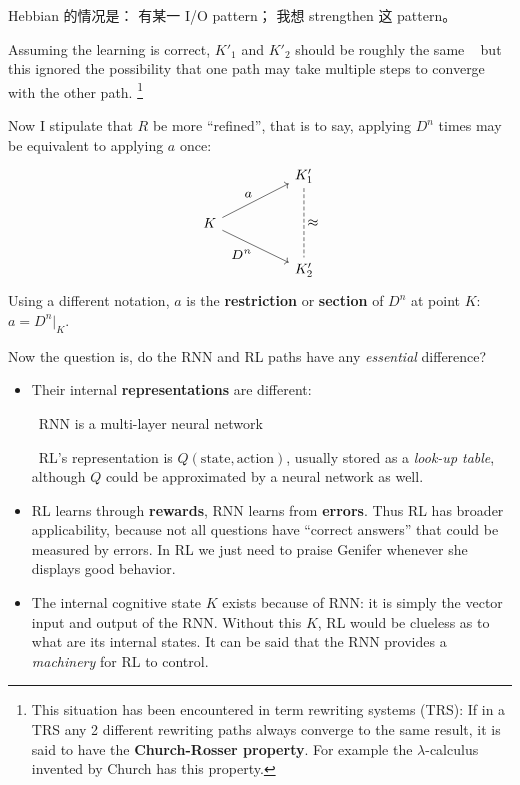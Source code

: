 \documentclass[orivec]{llncs}
\newcommand{\emp}[1]{\textbf{#1}}
\newcommand{\dashh}{\textemdash~}
\begin{document}
Hebbian 的情况是： 有某一 I/O pattern； 我想 strengthen 这 pattern。 

Assuming the learning is correct, $K'_1$ and $K'_2$ should be roughly the same \textemdash~ but this ignored the possibility that one path may take multiple steps to converge with the other path.  \footnote{This situation has been encountered in term rewriting systems (TRS):  If in a TRS any 2 different rewriting paths always converge to the same result, it is said to have the \emp{Church-Rosser property}.  For example the $\lambda$-calculus invented by Church has this property.} 

Now I stipulate that $R$ be more ``refined'', that is to say, applying $D^n$ times may be equivalent to applying $a$ once:
\begin{equation}
\begin{tikzcd}[column sep=huge]
& K'_1 \arrow[dd, dashed, no head, "\scalebox{1.3}{$\approx$}"] \\
K \arrow[ur, "\scalebox{1.3}{$a$}"] \arrow[dr, "{\scalebox{1.3}{$D^n$}}"'] & \\
& K'_2
\end{tikzcd}
\end{equation}
Using a different notation, $a$ is the \emp{restriction} or \emp{section} of $D^n$ at point $K$: $a = D^n|_K$.

Now the question is, do the RNN and RL paths have any \textit{essential} difference?
\begin{itemize}
\item Their internal \emp{representations} are different:\par
\dashh RNN is a multi-layer neural network\par
\dashh RL's representation is $Q(\mbox{state},\mbox{action})$, usually stored as a \textit{look-up table}, although $Q$ could be approximated by a neural network as well.
\item RL learns through \emp{rewards}, RNN learns from \emp{errors}.  Thus RL has broader applicability, because not all questions have ``correct answers'' that could be measured by errors.  In RL we just need to praise Genifer whenever she displays good behavior.
\item The internal cognitive state $K$ exists because of RNN:  it is simply the vector input and output of the RNN.  Without this $K$, RL would be clueless as to what are its internal states.  It can be said that the RNN provides a \textit{machinery} for RL to control.
\end{itemize}
\end{document}
